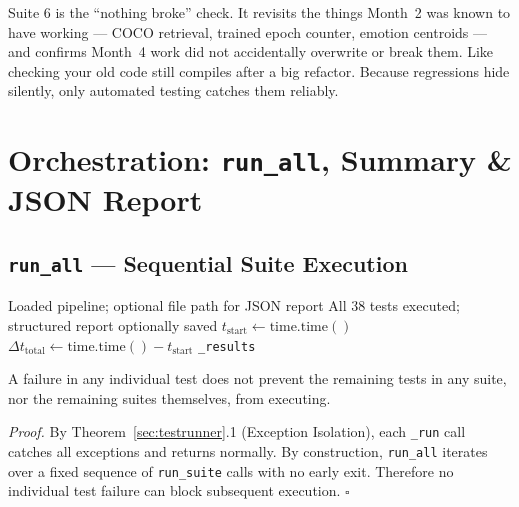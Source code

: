 \documentclass[12pt,a4paper]{article}
\newenvironment{plainbox}[1][Plain Language]{%
  \begin{tcolorbox}[
    enhanced, breakable,
    colback=lightpurplebox!40, colframe=purple!50,
    fonttitle=\bfseries\color{purple!70!black},
    title={#1},
    attach boxed title to top left={yshift=-2mm,xshift=5mm},
    boxed title style={colback=purple!40,colframe=purple!50}
  ]%
}{\end{tcolorbox}}
\newcounter{mthm}[section]
\newenvironment{mtheorem}[1][]{%
  \refstepcounter{mthm}%
  \begin{tcolorbox}[mythm, title={Theorem~\thesection.\themthm%
    \ifx\relax#1\relax\else\ (#1)\fi}]%
}{\end{tcolorbox}}
\begin{document}
\begin{plainbox}[Suite 6 Summary]
Suite 6 is the ``nothing broke'' check. It revisits the things Month~2 was known to have
working --- COCO retrieval, trained epoch counter, emotion centroids --- and confirms
Month~4 work did not accidentally overwrite or break them. Like checking your old code
still compiles after a big refactor. Because regressions hide silently, only automated
testing catches them reliably.
\end{plainbox}

\newpage

\section{Orchestration: \texttt{run\_all}, Summary \& JSON Report}
\label{sec:orchestration}

\subsection{\texttt{run\_all} --- Sequential Suite Execution}

\begin{algorithm}[H]
\caption{\texttt{run\_all(save\_path="")} --- Sequential execution of all 6 suites}
\label{alg:runall}
\begin{algorithmic}[1]
\Require Loaded pipeline; optional file path for JSON report
\Ensure All 38 tests executed; structured report optionally saved
\State $t_{\text{start}} \gets \text{time.time}()$
  \State {} 
\EndFor
\State $\Delta t_{\text{total}} \gets \text{time.time}() - t_{\text{start}}$
\State {}
  \State {}
\EndIf
\State \Return \texttt{\_results}
\end{algorithmic}
\end{algorithm}

\begin{mtheorem}[Suite Independence]
\label{thm:suite-independence}
A failure in any individual test does not prevent the remaining tests in any suite, nor
the remaining suites themselves, from executing.

\textit{Proof.} By Theorem~\ref{sec:testrunner}.1 (Exception Isolation), each
\texttt{\_run} call catches all exceptions and returns normally.
By construction, \texttt{run\_all} iterates over a fixed sequence of
\texttt{run\_suite} calls with no early exit. Therefore no individual test failure
can block subsequent execution. \hfill$\square$
\end{mtheorem}
\end{document}
